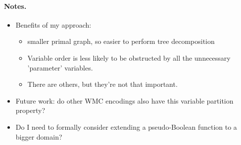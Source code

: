 \documentclass[runningheads]{llncs}
\begin{document}
\paragraph{Notes.}
\begin{itemize}
\item Benefits of my approach:
  \begin{itemize}
  \item smaller primal graph, so easier to perform tree decomposition
  \item Variable order is less likely to be obstructed by all the unnecessary
    'parameter' variables.
  \item There are others, but they're not that important.
  \end{itemize}
\item Future work: do other WMC encodings also have this variable partition
  property?
\item Do I need to formally consider extending a pseudo-Boolean function to a
  bigger domain?
\end{itemize}



\end{document}
